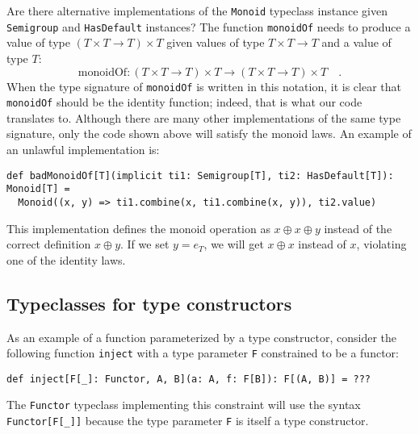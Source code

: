 Are there alternative implementations of the \lstinline!Monoid! typeclass
instance given \lstinline!Semigroup! and \lstinline!HasDefault!
instances? The function \lstinline!monoidOf! needs to produce a value
of type $\left(T\times T\rightarrow T\right)\times T$ given values
of type $T\times T\rightarrow T$ and a value of type $T$:
\[
\text{monoidOf}:\left(T\times T\rightarrow T\right)\times T\rightarrow\left(T\times T\rightarrow T\right)\times T\quad.
\]
When the type signature of \lstinline!monoidOf! is written in this
notation, it is clear that \lstinline!monoidOf! should be the identity
function; indeed, that is what our code translates to. Although there
are many other implementations of the same type signature, only the
code shown above will satisfy the monoid laws. An example of an unlawful
implementation is:
\begin{lstlisting}
def badMonoidOf[T](implicit ti1: Semigroup[T], ti2: HasDefault[T]): Monoid[T] =
  Monoid((x, y) => ti1.combine(x, ti1.combine(x, y)), ti2.value)
\end{lstlisting}
This implementation defines the monoid operation as $x\oplus x\oplus y$
instead of the correct definition $x\oplus y$. If we set $y=e_{T}$,
we will get $x\oplus x$ instead of $x$, violating one of the identity
laws.

\subsection{Typeclasses for type constructors\label{subsec:Typeclasses-for-type-constructors}}

As an example of a function parameterized by a type constructor, consider
the following function \lstinline!inject! with a type parameter \lstinline!F!
constrained to be a functor:
\begin{lstlisting}
def inject[F[_]: Functor, A, B](a: A, f: F[B]): F[(A, B)] = ???
\end{lstlisting}
The \lstinline!Functor! typeclass implementing this constraint will
use the syntax \lstinline!Functor[F[_]]! because the type parameter
\lstinline!F! is itself a type constructor. 

